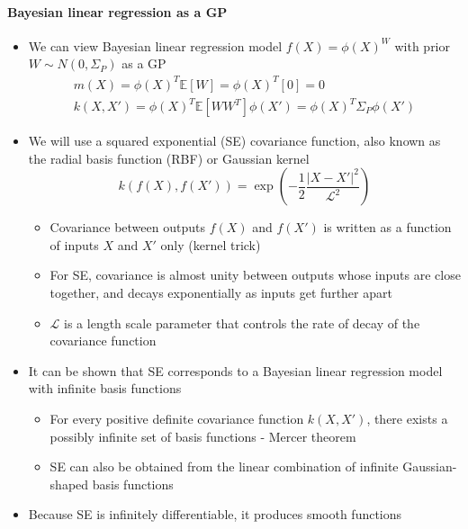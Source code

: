 \documentclass[12pt]{article}
\begin{document}
\paragraph{Bayesian linear regression as a GP}
\begin{itemize}
    \item We can view Bayesian linear regression model $f(X) = \phi(X)^W$ with prior $W \sim N(0, \Sigma_P)$ as a GP 
\begin{equation}
    \begin{aligned}
        m(X) = \phi(X)^T\mathbb{E}[W] = \phi(X)^T[0] = 0 \\
        k(X,X') = \phi(X)^T\mathbb{E}[WW^T]\phi(X') = \phi(X)^T\Sigma_P\phi(X')
    \end{aligned}
\end{equation}
    \item We will use a squared exponential (SE) covariance function, also known as the radial basis function (RBF) or Gaussian kernel
\begin{equation}
    k(f(X), f(X')) = \exp\left(-\frac{1}{2}\frac{|X - X'|^2}{\mathcal{L}^2}\right)
\end{equation}
    \begin{itemize}
        \item Covariance between outputs $f(X)$ and $f(X')$ is written as a function of inputs $X$ and $X'$ only (kernel trick)
        \item For SE, covariance is almost unity between outputs whose inputs are close together, and decays exponentially as inputs get further apart
        \item $\mathcal{L}$ is a length scale parameter that controls the rate of decay of the covariance function
    \end{itemize}
    \item It can be shown that SE corresponds to a Bayesian linear regression model with infinite basis functions
        \begin{itemize}
            \item For every positive definite covariance function $k(X,X')$, there exists a possibly infinite set of basis functions - Mercer theorem
            \item SE can also be obtained from the linear combination of infinite Gaussian-shaped basis functions
        \end{itemize}
    \item Because SE is infinitely differentiable, it produces smooth functions
\end{itemize}
\end{document}
